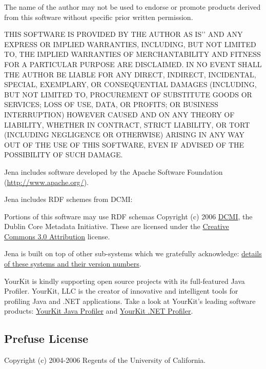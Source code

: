 \documentclass[letterpaper]{article}
\begin{document}
{\mdseries\upshape\color{black}
The name of the author may not be used to endorse or promote products derived from this software without specific prior written permission.}

{\mdseries\upshape\color{black}
THIS SOFTWARE IS PROVIDED BY THE AUTHOR {\textasciigrave}{\textasciigrave}AS IS'{}' AND ANY EXPRESS OR IMPLIED WARRANTIES, INCLUDING, BUT NOT LIMITED TO, THE IMPLIED WARRANTIES OF MERCHANTABILITY AND FITNESS FOR A PARTICULAR PURPOSE ARE DISCLAIMED. IN NO EVENT SHALL THE AUTHOR BE LIABLE FOR ANY DIRECT, INDIRECT, INCIDENTAL, SPECIAL, EXEMPLARY, OR CONSEQUENTIAL DAMAGES (INCLUDING, BUT NOT LIMITED TO, PROCUREMENT OF SUBSTITUTE GOODS OR SERVICES; LOSS OF USE, DATA, OR PROFITS; OR BUSINESS INTERRUPTION) HOWEVER CAUSED AND ON ANY THEORY OF LIABILITY, WHETHER IN CONTRACT, STRICT LIABILITY, OR TORT (INCLUDING NEGLIGENCE OR OTHERWISE) ARISING IN ANY WAY OUT OF THE USE OF THIS SOFTWARE, EVEN IF ADVISED OF THE POSSIBILITY OF SUCH DAMAGE.}

{\mdseries\upshape\color{black}
Jena includes software developed by the Apache Software Foundation (\url{http://www.apache.org/}).}

{\mdseries\upshape\color{black}
Jena includes RDF schemes from DCMI:}

{\mdseries\upshape\color{black}
Portions of this software may use RDF schemas Copyright (c) 2006 \href{http://dublincore.org/}{\textcolor[rgb]{0.0,0.0,0.6}{DCMI}}, the Dublin Core Metadata Initiative. These are licensed under the \href{http://creativecommons.org/licenses/by/3.0/}{\textcolor[rgb]{0.0,0.0,0.6}{Creative Commons 3.0 Attribution}} license.}

{\mdseries\upshape\color{black}
Jena is built on top of other sub-systems which we gratefully acknowledge: \href{http://jena.sourceforge.net/Licenses/index.html}{\textcolor[rgb]{0.0,0.0,0.6}{details of these systems and their version numbers}}.}

{\mdseries\upshape\color{black}
YourKit is kindly supporting open source projects with its full-featured Java Profiler. YourKit, LLC is the creator of innovative and intelligent tools for profiling Java and .NET applications. Take a look at YourKit's leading software products: \href{http://www.yourkit.com/java/profiler/index.jsp}{\textcolor[rgb]{0.0,0.0,0.6}{YourKit Java Profiler}} and \href{http://www.yourkit.com/.net/profiler/index.jsp}{\textcolor[rgb]{0.0,0.0,0.6}{YourKit .NET Profiler}}.}

\subsection{Prefuse License}
{\mdseries\upshape\color{black}
Copyright (c) 2004-2006 Regents of the University of California.}
\end{document}
